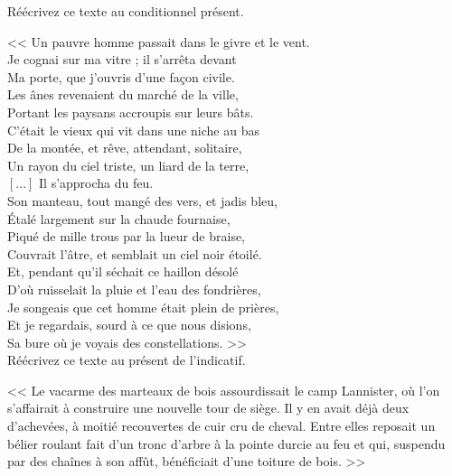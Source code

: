 \documentclass["../Cours.tex"]{subfiles}
\begin{document}
\begin{questions}
    \exercice Réécrivez ce texte au conditionnel présent.

    << Un pauvre homme passait dans le givre et le vent.\\
    Je cognai sur ma vitre ; il s'arrêta devant\\
    Ma porte, que j'ouvris d'une façon civile.\\
    Les ânes revenaient du marché de la ville,\\
    Portant les paysans accroupis sur leurs bâts.\\
    C'était le vieux qui vit dans une niche au bas\\
    De la montée, et rêve, attendant, solitaire,\\
    Un rayon du ciel triste, un liard de la terre,\\
    $\left[...\right]$ Il s'approcha du feu.\\
    Son manteau, tout mangé des vers, et jadis bleu,\\
    Étalé largement sur la chaude fournaise,\\
    Piqué de mille trous par la lueur de braise,\\
    Couvrait l'âtre, et semblait un ciel noir étoilé.\\
    Et, pendant qu'il séchait ce haillon désolé\\
    D'où ruisselait la pluie et l'eau des fondrières,\\
    Je songeais que cet homme était plein de prières,\\
    Et je regardais, sourd à ce que nous disions,\\
    Sa bure où je voyais des constellations. >> \\

    \exercice Réécrivez ce texte au présent de l'indicatif.

    << Le vacarme des marteaux de bois assourdissait le camp Lannister, où l'on s'affairait à construire une nouvelle tour de siège. Il y en avait déjà deux d'achevées, à moitié recouvertes de cuir cru de cheval. Entre elles reposait un bélier roulant fait d'un tronc d'arbre à la pointe durcie au feu et qui, suspendu par des chaînes à son affût, bénéficiait d'une toiture de bois. >>


\end{questions}
\end{document}
